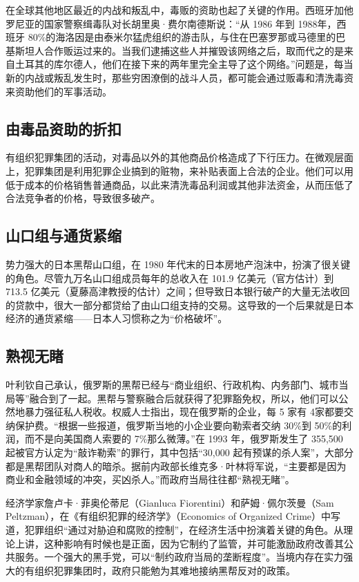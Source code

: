 在全球其他地区最近的内战和叛乱中，毒贩的资助也起了关键的作用。西班牙加他罗尼亚的国家警察缉毒队对长胡里奥·费尔南德斯说：“从 1986 年到 1988年，西班牙 80\%的海洛因是由泰米尔猛虎组织的游击队，与住在巴塞罗那或马德里的巴基斯坦人合作贩运过来的。当我们逮捕这些人并摧毁该网络之后，取而代之的是来自土耳其的库尔德人，他们在接下来的两年里完全主导了这个网络。”问题是，每当新的内战或叛乱发生时，那些穷困潦倒的战斗人员，都可能会通过贩毒和清洗毒资来资助他们的军事活动。

\subsection{由毒品资助的折扣}
有组织犯罪集团的活动，对毒品以外的其他商品价格造成了下行压力。在微观层面上，犯罪集团是利用犯罪企业搞到的赃物，来补贴表面上合法的企业。他们可以用低于成本的价格销售普通商品，以此来清洗毒品利润或其他非法资金，从而压低了合法竞争者的价格，导致很多破产。

\subsection{山口组与通货紧缩}
势力强大的日本黑帮山口组，在 1980 年代末的日本房地产泡沫中，扮演了很关键的角色。尽管九万名山口组成员每年的总收入在 101.9 亿美元（官方估计）到713.5 亿美元（夏藤高津教授的估计）之间；但导致日本银行破产的大量无法收回的贷款中，很大一部分都贷给了由山口组支持的交易。这导致的一个后果就是日本经济的通货紧缩——日本人习惯称之为“价格破坏”。

\subsection{熟视无睹}
叶利钦自己承认，俄罗斯的黑帮已经与“商业组织、行政机构、内务部门、城市当局等”融合到了一起。黑帮与警察融合后就获得了犯罪豁免权，所以，他们可以公然地暴力强征私人税收。权威人士指出，现在俄罗斯的企业，每 5 家有 4家都要交纳保护费。“根据一些报道，俄罗斯当地的小企业要向勒索者交纳 30\%到 50\%的利润，而不是向美国商人索要的 7\%那么微薄。”在 1993 年，俄罗斯发生了 355,500 起被官方认定为“敲诈勒索”的罪行，其中包括“30,000 起有预谋的杀人案”，大部分都是黑帮团队对商人的暗杀。据前内政部长维克多·叶林将军说，“主要都是因为商业和金融领域的冲突，买凶杀人。”而政府当局往往都“熟视无睹”。

经济学家詹卢卡·菲奥伦蒂尼（Gianluca Fiorentini）和萨姆·佩尔茨曼（Sam Peltzman），在《有组织犯罪的经济学》（Economics of Organized Crime）中写道，犯罪组织“通过对胁迫和腐败的控制”，在经济生活中扮演着关键的角色。从理论上讲，这种影响有时候也是正面，因为它制约了监管，并可能激励政府改善其公共服务。一个强大的黑手党，可以“制约政府当局的垄断程度”。当境内存在实力强大的有组织犯罪集团时，政府只能勉为其难地接纳黑帮反对的政策。

